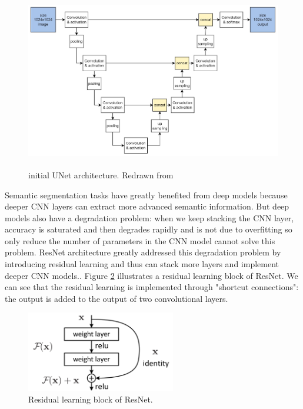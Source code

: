 \documentclass[12pt]{article}
\begin{document}
\begin{figure}[H]
    \centering
    \includegraphics[height=220pt]{images/unet.jpg}
    \caption{initial UNet architecture. Redrawn from \cite{ronneberger2015u}}
    \label{fig:unet}
\end{figure}

Semantic segmentation tasks have greatly benefited from deep models because deeper CNN layers can extract more advanced semantic information\cite{Girshick_2014_CVPR}. But deep models also have a degradation problem: when we keep stacking the CNN layer, accuracy is saturated and then degrades rapidly and is not due to overfitting so only reduce the number of parameters in the CNN model cannot solve this problem. ResNet architecture greatly addressed this degradation problem by introducing residual learning and thus can stack more layers and implement deeper CNN models.\cite{he2016deep}. Figure \ref{fig:resnet} illustrates a residual learning block of ResNet. We can see that the residual learning is implemented through "shortcut connections": the output is added to the output of two convolutional layers. 

\begin{figure}[H]
    \centering
    \includegraphics[height=100pt]{images/resnet.png}
    \caption{Residual learning block of ResNet.\cite{he2016deep}}
    \label{fig:resnet}
\end{figure}
\end{document}

